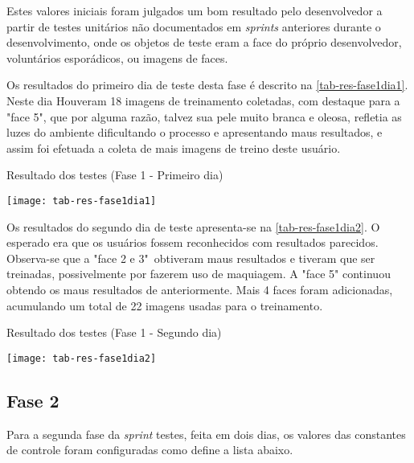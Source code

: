 Estes valores iniciais foram julgados um bom resultado pelo desenvolvedor a partir de testes unitários não documentados em \textit{sprints} anteriores durante o desenvolvimento, onde os objetos de teste eram a face do próprio desenvolvedor, voluntários esporádicos, ou imagens de faces.

Os resultados do primeiro dia de teste desta fase é descrito na \autoref{tab-res-fase1dia1}. Neste dia Houveram 18 imagens de treinamento coletadas, com destaque para a "face 5", que por alguma razão, talvez sua pele muito branca e oleosa, refletia as luzes do ambiente dificultando o processo e apresentando maus resultados, e assim foi efetuada a coleta de mais imagens de treino deste usuário.

\begin{table}[h]
	\centering
	\caption{Resultado dos testes (Fase 1 - Primeiro dia) }
	\texttt{[image: tab-res-fase1dia1]}
	\label{tab-res-fase1dia1}
\end{table}

Os resultados do segundo dia de teste apresenta-se na \autoref{tab-res-fase1dia2}. O esperado era que os usuários fossem reconhecidos com resultados parecidos. Observa-se que a "face 2 e 3"\ obtiveram maus resultados e tiveram que ser treinadas, possivelmente por fazerem uso de maquiagem. A "face 5" continuou obtendo os maus resultados de anteriormente. Mais 4 faces foram adicionadas, acumulando um total de 22 imagens usadas para o treinamento.

\begin{table}[h]
	\centering
	\caption{Resultado dos testes (Fase 1 - Segundo dia) }
	\texttt{[image: tab-res-fase1dia2]}
	\label{tab-res-fase1dia2}
\end{table}



\subsection{Fase 2}\label{ch:testresultfaz2}
Para a segunda fase da \textit{sprint} testes, feita em dois dias, os valores das constantes de controle foram configuradas como define a lista abaixo.

